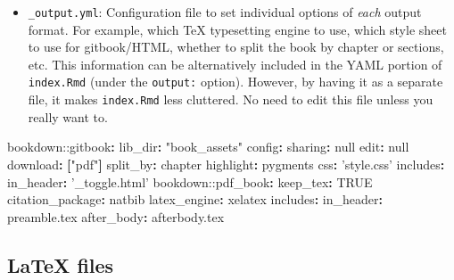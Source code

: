 \documentclass[
  oneside]{krantz}
\newenvironment{Shaded}{\begin{snugshade}}{\end{snugshade}}
\newcommand{\AttributeTok}[1]{\textcolor[rgb]{0.77,0.63,0.00}{#1}}
\newcommand{\CharTok}[1]{\textcolor[rgb]{0.31,0.60,0.02}{#1}}
\newcommand{\FunctionTok}[1]{\textcolor[rgb]{0.00,0.00,0.00}{#1}}
\newcommand{\KeywordTok}[1]{\textcolor[rgb]{0.13,0.29,0.53}{\textbf{#1}}}
\newcommand{\StringTok}[1]{\textcolor[rgb]{0.31,0.60,0.02}{#1}}
\providecommand{\tightlist}{%
  \setlength{\itemsep}{0pt}\setlength{\parskip}{0pt}}
\theoremstyle{definition}
\theoremstyle{definition}
\theoremstyle{definition}
\theoremstyle{remark}
\begin{document}
\begin{itemize}
\tightlist
\item
  \texttt{\_output.yml}: Configuration file to set individual options of \emph{each} output format. For example, which TeX typesetting engine to use, which style sheet to use for gitbook/HTML, whether to split the book by chapter or sections, etc. This information can be alternatively included in the YAML portion of \texttt{index.Rmd} (under the \texttt{output:} option). However, by having it as a separate file, it makes \texttt{index.Rmd} less cluttered. No need to edit this file unless you really want to.
\end{itemize}

\begin{Shaded}
\begin{Highlighting}[]
\AttributeTok{bookdown:}\FunctionTok{:gitbook}\KeywordTok{:}
\AttributeTok{  }\FunctionTok{lib_dir}\KeywordTok{:}\AttributeTok{ }\StringTok{"book_assets"}
\AttributeTok{  }\FunctionTok{config}\KeywordTok{:}
\AttributeTok{    }\FunctionTok{sharing}\KeywordTok{:}\AttributeTok{ }\CharTok{null}
\AttributeTok{    }\FunctionTok{edit}\KeywordTok{:}\AttributeTok{ }\CharTok{null}
\AttributeTok{    }\FunctionTok{download}\KeywordTok{:}\AttributeTok{ }\KeywordTok{[}\StringTok{"pdf"}\KeywordTok{]}
\AttributeTok{  }\FunctionTok{split_by}\KeywordTok{:}\AttributeTok{ chapter}
\AttributeTok{  }\FunctionTok{highlight}\KeywordTok{:}\AttributeTok{ pygments}
\AttributeTok{  }\FunctionTok{css}\KeywordTok{:}\AttributeTok{ }\StringTok{'style.css'}
\AttributeTok{  }\FunctionTok{includes}\KeywordTok{:}
\AttributeTok{    }\FunctionTok{in_header}\KeywordTok{:}\AttributeTok{ }\StringTok{'_toggle.html'}
\AttributeTok{    }
\AttributeTok{bookdown:}\FunctionTok{:pdf_book}\KeywordTok{:}
\AttributeTok{  }\FunctionTok{keep_tex}\KeywordTok{:}\AttributeTok{ }\CharTok{TRUE}
\AttributeTok{  }\FunctionTok{citation_package}\KeywordTok{:}\AttributeTok{ natbib}
\AttributeTok{  }\FunctionTok{latex_engine}\KeywordTok{:}\AttributeTok{ xelatex}
\AttributeTok{  }\FunctionTok{includes}\KeywordTok{:}
\AttributeTok{    }\FunctionTok{in_header}\KeywordTok{:}\AttributeTok{ preamble.tex}
\AttributeTok{    }\FunctionTok{after_body}\KeywordTok{:}\AttributeTok{ afterbody.tex}
\end{Highlighting}
\end{Shaded}

\hypertarget{latex-files}{%
\subsection*{LaTeX files}\label{latex-files}}
\end{document}
